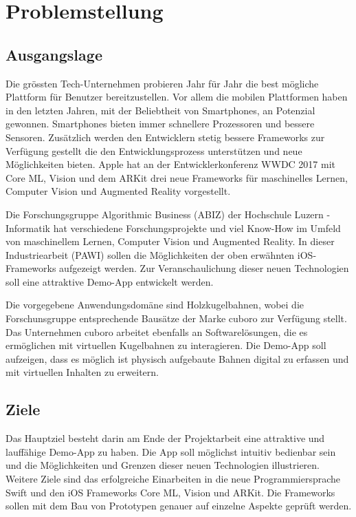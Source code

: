 \section{Problemstellung}

\subsection{Ausgangslage}

Die grössten Tech-Unternehmen probieren Jahr für Jahr die best mögliche Plattform für Benutzer bereitzustellen. Vor allem die mobilen Plattformen haben in den letzten Jahren, mit der Beliebtheit von Smartphones, an Potenzial gewonnen. Smartphones bieten immer schnellere Prozessoren und bessere Sensoren. Zusätzlich werden den Entwicklern stetig bessere Frameworks zur Verfügung gestellt die den Entwicklungsprozess unterstützen und neue Möglichkeiten bieten. Apple hat an der Entwicklerkonferenz WWDC 2017 mit Core ML, Vision und dem ARKit drei neue Frameworks für maschinelles Lernen, Computer Vision und Augmented Reality vorgestellt.


Die Forschungsgruppe Algorithmic Business (ABIZ) der Hochschule Luzern - Informatik hat verschiedene Forschungsprojekte und viel Know-How im Umfeld von maschinellem Lernen, Computer Vision und Augmented Reality. In dieser Industriearbeit (PAWI) sollen die Möglichkeiten der oben erwähnten iOS-Frameworks aufgezeigt werden. Zur Veranschaulichung dieser neuen Technologien soll eine attraktive Demo-App entwickelt werden. 


Die vorgegebene Anwendungsdomäne sind Holzkugelbahnen, wobei die Forschunsgruppe entsprechende Bausätze der Marke cuboro zur Verfügung stellt. Das Unternehmen cuboro arbeitet ebenfalls an Softwarelösungen, die es ermöglichen mit virtuellen Kugelbahnen zu interagieren. Die Demo-App soll aufzeigen, dass es möglich ist physisch aufgebaute Bahnen digital zu erfassen und mit virtuellen Inhalten zu erweitern.


\subsection{Ziele}
Das Hauptziel besteht darin am Ende der Projektarbeit eine attraktive und lauffähige Demo-App zu haben. Die App soll möglichst intuitiv bedienbar sein und die Möglichkeiten und Grenzen dieser neuen Technologien illustrieren. Weitere Ziele sind das erfolgreiche Einarbeiten in die neue Programmiersprache Swift und den iOS Frameworks Core ML, Vision und ARKit. Die Frameworks sollen mit dem Bau von Prototypen genauer auf einzelne Aspekte geprüft werden.

